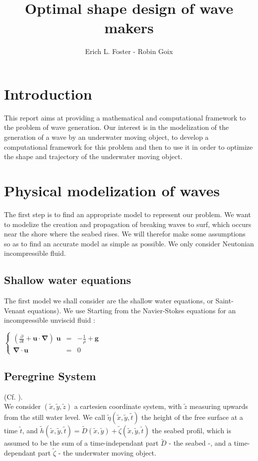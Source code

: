 \documentclass[11pt,a4paper]{article}
\author{Erich L. Foster - Robin Goix}
\title{Optimal shape design of wave makers}
\begin{document}
\maketitle

\tableofcontents
{}
\pagebreak
\section*{Introduction}
This report aims at providing a mathematical and computational framework to the problem of wave generation. Our interest is in the modelization of the generation of a wave by an underwater moving object, to develop a computational framework for this problem and then to use it in order to optimize the shape and trajectory of the underwater moving object.

\pagebreak
\section{Physical modelization of waves}
The first step is to find an appropriate model to represent our problem. 
We want to modelize the creation and propagation of breaking waves to surf, which occurs near the shore where the seabed rises. We will therefor make some assumptions so as to find an accurate model as simple as possible. We only consider Neutonian incompressible fluid.

\subsection{Shallow water equations}

The first model we shall consider are the shallow water equations, or Saint-Venant equations).
We use \cite{JMC2013}
Starting from the Navier-Stokes equations for an incompressible unviscid fluid : 

\begin{center}
$\left\lbrace
\begin{array}{rll}
\displaystyle (\frac{\partial}{\partial t} + \mathbf{u} \cdot \mathbf{\nabla}) \; \mathbf{u} & = & \displaystyle -\frac{1}{\rho} + \mathbf{g} \\
\mathbf{\nabla} \cdot \mathbf{u} & = & 0 
\end{array} \right.$
\end{center}

\pagebreak

\subsection{Peregrine System}
(Cf. \cite{DM2013}).\\ We consider $(\tilde{x},\tilde{y},\tilde{z})$ a cartesien coordinate system, with $\tilde{z}$ measuring upwards from the still water level. We call $\tilde{\eta}(\tilde{x},\tilde{y},\tilde{t})$ the height of the free surface at a time $\tilde{t}$, and $\tilde{h}(\tilde{x},\tilde{y},\tilde{t}) = \tilde{D}(\tilde{x},\tilde{y}) + \tilde{\zeta}(\tilde{x},\tilde{y},\tilde{t})$ the seabed profil, which is assumed to be the sum of a time-independant part $\tilde{D}$ - the seabed -, and a time-dependant part $\tilde{\zeta}$ - the underwater moving object.
\end{document}
